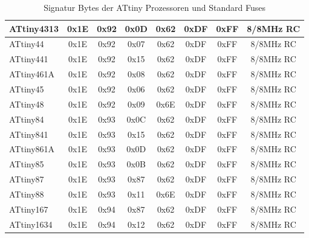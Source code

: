 \begin{table}[H]
\begin{center}
\begin{tabular}{| l | c | c | c || c | c | c | c |}
    \hline
ATtiny4313 & 0x1E & 0x92  & 0x0D & 0x62 & 0xDF & 0xFF & 8/8MHz RC \\
    \hline
ATtiny44   & 0x1E & 0x92  & 0x07 & 0x62 & 0xDF & 0xFF & 8/8MHz RC \\
    \hline
ATtiny441  & 0x1E & 0x92  & 0x15 & 0x62 & 0xDF & 0xFF & 8/8MHz RC \\
    \hline
ATtiny461A & 0x1E & 0x92  & 0x08 & 0x62 & 0xDF & 0xFF & 8/8MHz RC \\
    \hline
ATtiny45   & 0x1E & 0x92  & 0x06 & 0x62 & 0xDF & 0xFF & 8/8MHz RC \\
    \hline
ATtiny48   & 0x1E & 0x92  & 0x09 & 0x6E & 0xDF & 0xFF & 8/8MHz RC \\
    \hline
ATtiny84   & 0x1E & 0x93  & 0x0C & 0x62 & 0xDF & 0xFF & 8/8MHz RC \\
    \hline
ATtiny841  & 0x1E & 0x93  & 0x15 & 0x62 & 0xDF & 0xFF & 8/8MHz RC \\
    \hline
ATtiny861A & 0x1E & 0x93  & 0x0D & 0x62 & 0xDF & 0xFF & 8/8MHz RC \\
    \hline
ATtiny85   & 0x1E & 0x93  & 0x0B & 0x62 & 0xDF & 0xFF & 8/8MHz RC \\
    \hline
ATtiny87   & 0x1E & 0x93  & 0x87 & 0x62 & 0xDF & 0xFF & 8/8MHz RC \\
    \hline
ATtiny88   & 0x1E & 0x93  & 0x11 & 0x6E & 0xDF & 0xFF & 8/8MHz RC \\
    \hline
ATtiny167  & 0x1E & 0x94  & 0x87 & 0x62 & 0xDF & 0xFF & 8/8MHz RC \\
    \hline
ATtiny1634 & 0x1E & 0x94  & 0x12 & 0x62 & 0xDF & 0xFF & 8/8MHz RC \\
    \hline
    \end{tabular}
  \end{center}
  \caption{Signatur Bytes der ATtiny Prozessoren und Standard Fuses}
  \label{tab:tinySignature}
\end{table}


